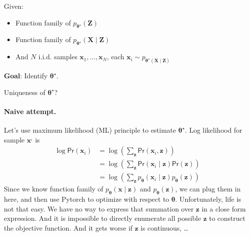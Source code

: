 \documentclass[11pt,a4paper]{article}
\begin{document}
\begin{block}
Given:
\begin{itemize}
    \item Function family of $p_{\boldsymbol \theta^{\star }}(\bm{Z})$
    \item Function family of $p_{\boldsymbol \theta^{\star }}(\bm{X} \mid \bm{Z})$
    \item And $N$ i.i.d. samples $\bm{x}_{1}, \ldots , \bm{x}_N$, each $\bm{x}_i \sim p_{\boldsymbol \theta^{\star }(\bm{X} \mid \bm{Z})}$
\end{itemize}
\textbf{Goal}: Identify $\boldsymbol \theta^{\star }$. 
\end{block}
{\blue Uniqueness of $\boldsymbol \theta^{\star }$? }

\paragraph{Naive attempt.} 
Let's use maximum likelihood (ML) principle to estimate $\boldsymbol \theta^{\star }$. Log likelihood for sample $\bm{x}^{_i}$ is
\begin{align*}
\log \textsf{Pr}(\bm{x}_i) 
&= \log \left( \sum_{\bm{z}} \textsf{Pr}(\bm{x}_i, \bm{z}) \right) \\
&= \log \left( \sum_{\bm{z}} \textsf{Pr}(\bm{x}_i \mid \bm{z}) \textsf{Pr}(\bm{z}) \right) \\
&= \log \left( \sum_{\bm{z}} p_{\boldsymbol \theta}(\bm{x}_i \mid \bm{z}) p_{\boldsymbol \theta}(\bm{z}) \right)
\end{align*}
Since we know function family of $p_{\boldsymbol \theta}(\bm{x} \mid \bm{z})$ and $p_{\boldsymbol \theta}(\bm{z})$, we can plug them in here,
and then use Pytorch to optimize with respect to $\boldsymbol \theta$.
Unfortunately, life is not that easy. We have no way to express that summation over $\bm{z}$ in a close form expression. And it is impossible to directly enumerate all possible $\bm{z}$ to construct the objective function. And it gets worse if $\bm{z}$ is continuous, \ldots
\end{document}
